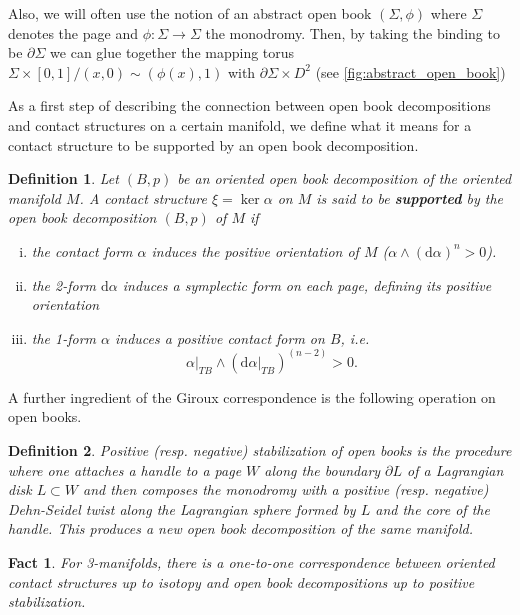 \documentclass{amsart}
\newtheorem{definition}{Definition}
\newtheorem{fact}{Fact}
\renewcommand*{\d}{\mathrm{d}}
\begin{document}
Also, we will often use the notion of an abstract open book $(\Sigma, \phi)$
where $\Sigma$ denotes the page and $\phi: \Sigma \to \Sigma$ the monodromy.
Then, by taking the binding to be $\partial \Sigma$ we can glue together the 
mapping torus $\Sigma \times [0,1] / (x, 0) \sim (\phi(x), 1)$
with $\partial \Sigma \times D^2$ (see \cref{fig:abstract_open_book})

As a first step of describing the connection between open book decompositions and 
contact structures on a certain manifold, we define what it means for a contact structure to be
supported by an open book decomposition.
\begin{definition}\label{def:support}\cite{Geiges08}
    Let $(B,p)$ be an oriented open book decomposition of the oriented manifold $M$.
    A contact structure $\xi = \ker \alpha$ on $M$ is said to be \textbf{supported} by the open book decomposition $(B,p)$ of $M$ if
    \begin{enumerate}[(i)]
        \item the contact form $\alpha$ induces the positive orientation of $M$ ($\alpha \wedge (\d \alpha)^n > 0$).
        \item the 2-form $\d \alpha$ induces a symplectic form on each page, defining its positive orientation
        \item the 1-form $\alpha$ induces a positive contact form on $B$, i.e. 
        \[ 
            \alpha|_{TB} \wedge (\d \alpha|_{TB})^{(n-2)} > 0.
        \]
    \end{enumerate}
\end{definition}

A further ingredient of the Giroux correspondence is the following operation on open books.
\begin{definition}\cite{Koert17}
    Positive (resp. negative) \textit{stabilization of open books} is the procedure where
    one attaches a handle to a page $W$ along the boundary $\partial L$ of a Lagrangian disk $L\subset W$ and then composes the monodromy with
    a positive (resp. negative) Dehn-Seidel twist along the Lagrangian sphere formed by $L$ 
    and the core of the handle.
    This produces a new open book decomposition of the same manifold.
\end{definition}

\begin{fact}\cite{Giroux02}
For 3-manifolds, there is a one-to-one correspondence between oriented contact structures up to isotopy
and open book decompositions up to positive stabilization.
\end{fact}
\end{document}
